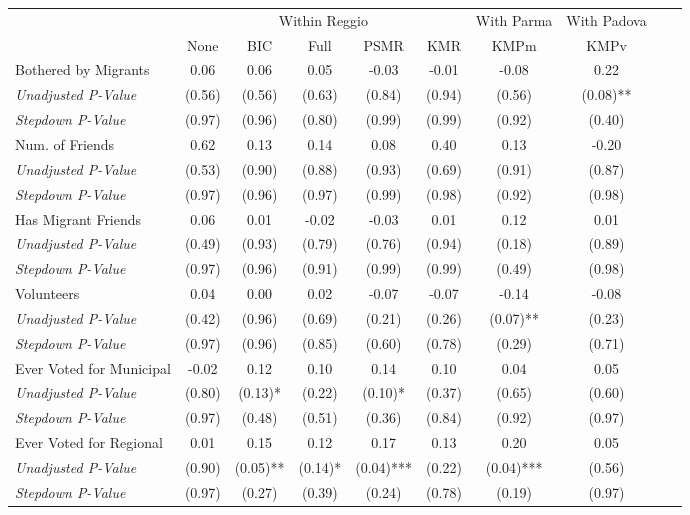 \begin{tabular}{l c c c c c c c c c}
\toprule
& \multicolumn{5}{c}{Within Reggio} & With Parma & With Padova \\\cmidrule(lr){2-6} \cmidrule(lr){7} \cmidrule(lr){8}
 & None & BIC & Full & PSMR & KMR & KMPm & KMPv \\
\midrule
Bothered by Migrants & 0.06 & 0.06 & 0.05 & -0.03 & -0.01 & -0.08 & 0.22 \\
\quad \textit{Unadjusted P-Value} & (0.56) & (0.56) & (0.63) & (0.84) & (0.94) & (0.56) & (0.08)** \\
\quad \textit{Stepdown P-Value} & (0.97) & (0.96) & (0.80) & (0.99) & (0.99) & (0.92) & (0.40) \\
Num. of Friends & 0.62 & 0.13 & 0.14 & 0.08 & 0.40 & 0.13 & -0.20 \\
\quad \textit{Unadjusted P-Value} & (0.53) & (0.90) & (0.88) & (0.93) & (0.69) & (0.91) & (0.87) \\
\quad \textit{Stepdown P-Value} & (0.97) & (0.96) & (0.97) & (0.99) & (0.98) & (0.92) & (0.98) \\
Has Migrant Friends & 0.06 & 0.01 & -0.02 & -0.03 & 0.01 & 0.12 & 0.01 \\
\quad \textit{Unadjusted P-Value} & (0.49) & (0.93) & (0.79) & (0.76) & (0.94) & (0.18) & (0.89) \\
\quad \textit{Stepdown P-Value} & (0.97) & (0.96) & (0.91) & (0.99) & (0.99) & (0.49) & (0.98) \\
Volunteers & 0.04 & 0.00 & 0.02 & -0.07 & -0.07 & -0.14 & -0.08 \\
\quad \textit{Unadjusted P-Value} & (0.42) & (0.96) & (0.69) & (0.21) & (0.26) & (0.07)** & (0.23) \\
\quad \textit{Stepdown P-Value} & (0.97) & (0.96) & (0.85) & (0.60) & (0.78) & (0.29) & (0.71) \\
Ever Voted for Municipal & -0.02 & 0.12 & 0.10 & 0.14 & 0.10 & 0.04 & 0.05 \\
\quad \textit{Unadjusted P-Value} & (0.80) & (0.13)* & (0.22) & (0.10)* & (0.37) & (0.65) & (0.60) \\
\quad \textit{Stepdown P-Value} & (0.97) & (0.48) & (0.51) & (0.36) & (0.84) & (0.92) & (0.97) \\
Ever Voted for Regional & 0.01 & 0.15 & 0.12 & 0.17 & 0.13 & 0.20 & 0.05 \\
\quad \textit{Unadjusted P-Value} & (0.90) & (0.05)** & (0.14)* & (0.04)*** & (0.22) & (0.04)*** & (0.56) \\
\quad \textit{Stepdown P-Value} & (0.97) & (0.27) & (0.39) & (0.24) & (0.78) & (0.19) & (0.97) \\
\bottomrule
\end{tabular}
